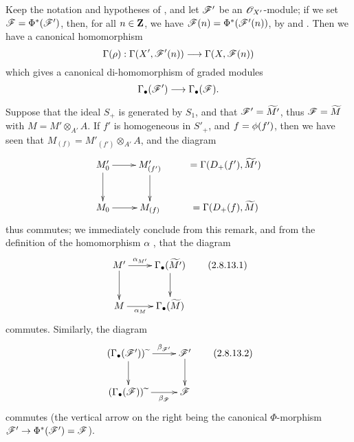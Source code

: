 \begin{env}[2.8.13]
\label{II.2.8.13}
Keep the notation and hypotheses of , and let $\mathscr{F}'$ be an $\mathscr{O}_{X'}$-module;
if we set $\mathscr{F}=\Phi^*(\mathscr{F}')$, then, for all $n\in\mathbf{Z}$, we have $\mathscr{F}(n)=\Phi^*(\mathscr{F}'(n))$, by  and .
Then  we have a canonical homomorphism
\[
  \Gamma(\rho): \Gamma(X',\sh{F}'(n)) \to \Gamma(X,\sh{F}(n))
\]
which gives a canonical di-homomorphism of graded modules
\[
  \Gamma_\bullet(\sh{F}') \to \Gamma_\bullet(\sh{F}).
\]

Suppose that the ideal $S_+$ is generated by $S_1$, and that $\mathscr{F}'=\widetilde{M'}$, thus $\mathscr{F}=\widetilde{M}$ with $M=M'\otimes_{A'}A$.
If $f'$ is homogeneous in $S'_+$, and $f=\phi(f')$, then we have seen that $M_{(f)}=M'_{(f')}\otimes_{A'}A$, and the diagram
\[
  \xymatrix{
    M'_0 \ar[r] \ar[d]
    & M'_{(f')} \ar[d]
    & =\Gamma(D_+(f'),\widetilde{M'})
  \\M_0 \ar[r]
    & M_{(f)}
    & =\Gamma(D_+(f),\widetilde{M})
  }
\]
thus commutes;
we immediately conclude from this remark, and from the definition of the homomorphism $\alpha$ , that the diagram
\[
\label{II.2.8.13.1}
  \xymatrix{
    M' \ar[r]^-{\alpha_{M'}} \ar[d]
    & \Gamma_\bullet(\widetilde{M'}) \ar[d]
  \\M \ar[r]_-{\alpha_M}
    & \Gamma_\bullet(\widetilde{M})
  }
\tag{2.8.13.1}
\]
commutes.
Similarly, the diagram
\[
\label{II.2.8.13.2}
  \xymatrix{
    (\Gamma_\bullet(\sh{F}'))\supertilde \ar[r]^-{\beta_{\sh{F}'}} \ar[d]
    & \sh{F}' \ar[d]
  \\(\Gamma_\bullet(\sh{F}))\supertilde \ar[r]_-{\beta_{\sh{F}}}
    & \sh{F}
  }
\tag{2.8.13.2}
\]
commutes (the vertical arrow on the right being the canonical $\Phi$-morphism $\sh{F}'\to\Phi^*(\sh{F}')=\sh{F}$).
\end{env}


